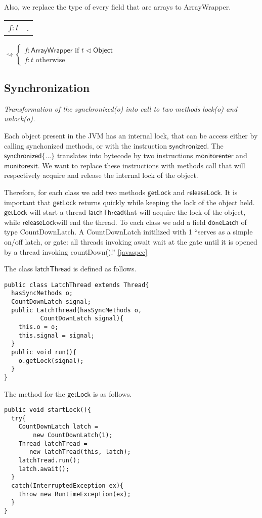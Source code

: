 \documentclass[a4paper, 11pt, english]{article}
\newcommand{\inherits}{\triangleleft}
\newcommand{\obj}{\mathsf{Object}}
\newcommand{\ArrayWrapper}{\mathsf{ArrayWrapper}}
\begin{document}
 Also, we replace the type of every field that are arrays to ArrayWrapper.
 
 
 \begin{tabular}{ll}
 $f : t $ & $ $.
 \end{tabular}
$ \rightsquigarrow 
  \begin{cases}f : \ArrayWrapper \text{ if } t \inherits \obj \\
   f : t \text{ otherwise} \end{cases}$
\subsection{Synchronization}
\textit{
Transformation of the synchronized(o){ } into call to two methods
lock(o) and unlock(o).}

Each object present in the JVM has an internal lock, that can be access either by calling synchonized methods, or with the instruction $\mathsf{synchronized}$. The $\mathsf{synchronized}\{ ... \} $ translates into bytecode by two instructions $\mathsf{monitorenter}$ and $\mathsf{monitorexit}$. We want to replace these instructions with methods call that will respectively acquire and release the internal lock of the object.

\newcommand{\getLock}{$\mathsf{getLock}$}
\newcommand{\releaseLock}{$\mathsf{releaseLock}$}
\newcommand{\latchTread}{$\mathsf{latchThread}$}
\newcommand{\doneLatch}{$\mathsf{doneLatch}$}
Therefore, for each class we add two methods \getLock{} and \releaseLock. It is important that \getLock{} returns quickly while keeping the lock of the object held. \getLock{} will start a thread \latchTread that will acquire the lock of the object, while \releaseLock will end the thread. To each class we add a field \doneLatch{} of type CountDownLatch. A CountDownLatch initilized with 1 \enquote{serves as a simple on/off latch, or gate: all threads invoking await wait at the gate until it is opened by a thread invoking countDown().} \ref{javaspec}


 The class \latchTread{} is defined as follows.

\begin{lstlisting}
public class LatchThread extends Thread{  
  hasSyncMethods o;
  CountDownLatch signal;  
  public LatchThread(hasSyncMethods o,
          CountDownLatch signal){
    this.o = o;
    this.signal = signal;
  }    
  public void run(){
    o.getLock(signal);
  }    
}
\end{lstlisting}
The method for the \getLock{} is as follows.
\begin{lstlisting}
public void startLock(){
  try{
    CountDownLatch latch = 
        new CountDownLatch(1);
    Thread latchTread = 
       new latchTread(this, latch);
    latchTread.run();
    latch.await();
  }
  catch(InterruptedException ex){
    throw new RuntimeException(ex);
  }
}
\end{lstlisting}
\end{document}

